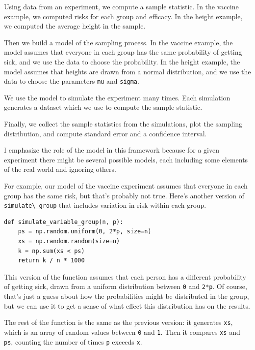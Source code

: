 Using data from an experiment, we compute a sample statistic. In the
vaccine example, we computed risks for each group and efficacy. In the
height example, we computed the average height in the sample.

Then we build a model of the sampling process. In the vaccine example,
the model assumes that everyone in each group has the same probability
of getting sick, and we use the data to choose the probability. In the
height example, the model assumes that heights are drawn from a normal
distribution, and we use the data to choose the parameters
\passthrough{\lstinline!mu!} and \passthrough{\lstinline!sigma!}.

We use the model to simulate the experiment many times. Each simulation
generates a dataset which we use to compute the sample statistic.

Finally, we collect the sample statistics from the simulations, plot the
sampling distribution, and compute standard error and a confidence
interval.

I emphasize the role of the model in this framework because for a given
experiment there might be several possible models, each including some
elements of the real world and ignoring others.

For example, our model of the vaccine experiment assumes that everyone
in each group has the same risk, but that's probably not true. Here's
another version of \passthrough{\lstinline!simulate\_group!} that
includes variation in risk within each group.

\begin{lstlisting}[]
def simulate_variable_group(n, p):
    ps = np.random.uniform(0, 2*p, size=n)
    xs = np.random.random(size=n)
    k = np.sum(xs < ps)
    return k / n * 1000
\end{lstlisting}

This version of the function assumes that each person has a different
probability of getting sick, drawn from a uniform distribution between
\passthrough{\lstinline!0!} and \passthrough{\lstinline!2*p!}. Of
course, that's just a guess about how the probabilities might be
distributed in the group, but we can use it to get a sense of what
effect this distribution has on the results.

The rest of the function is the same as the previous version: it
generates \passthrough{\lstinline!xs!}, which is an array of random
values between \passthrough{\lstinline!0!} and
\passthrough{\lstinline!1!}. Then it compares
\passthrough{\lstinline!xs!} and \passthrough{\lstinline!ps!}, counting
the number of times \passthrough{\lstinline!p!} exceeds
\passthrough{\lstinline!x!}.

